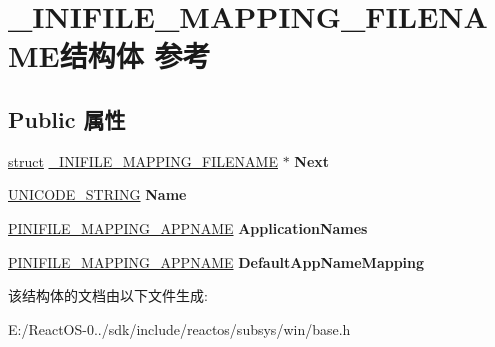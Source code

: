 \hypertarget{struct___i_n_i_f_i_l_e___m_a_p_p_i_n_g___f_i_l_e_n_a_m_e}{}\section{\+\_\+\+I\+N\+I\+F\+I\+L\+E\+\_\+\+M\+A\+P\+P\+I\+N\+G\+\_\+\+F\+I\+L\+E\+N\+A\+M\+E结构体 参考}
\label{struct___i_n_i_f_i_l_e___m_a_p_p_i_n_g___f_i_l_e_n_a_m_e}
\subsection*{Public 属性}
\begin{DoxyCompactItemize}
\item 
\mbox{\label{struct___i_n_i_f_i_l_e___m_a_p_p_i_n_g___f_i_l_e_n_a_m_e_aa313afd24e17a2bb6e35eb5c409fce0e}} 
\hyperlink{interfacestruct}{struct} \hyperlink{struct___i_n_i_f_i_l_e___m_a_p_p_i_n_g___f_i_l_e_n_a_m_e}{\+\_\+\+I\+N\+I\+F\+I\+L\+E\+\_\+\+M\+A\+P\+P\+I\+N\+G\+\_\+\+F\+I\+L\+E\+N\+A\+ME} $\ast$ {\bfseries Next}
\item 
\mbox{\label{struct___i_n_i_f_i_l_e___m_a_p_p_i_n_g___f_i_l_e_n_a_m_e_aabda1295635b252870640752d7448807}} 
\hyperlink{struct___u_n_i_c_o_d_e___s_t_r_i_n_g}{U\+N\+I\+C\+O\+D\+E\+\_\+\+S\+T\+R\+I\+NG} {\bfseries Name}
\item 
\mbox{\label{struct___i_n_i_f_i_l_e___m_a_p_p_i_n_g___f_i_l_e_n_a_m_e_a5af554ac5f18413ec91afc6218ea0535}} 
\hyperlink{struct___i_n_i_f_i_l_e___m_a_p_p_i_n_g___a_p_p_n_a_m_e}{P\+I\+N\+I\+F\+I\+L\+E\+\_\+\+M\+A\+P\+P\+I\+N\+G\+\_\+\+A\+P\+P\+N\+A\+ME} {\bfseries Application\+Names}
\item 
\mbox{\label{struct___i_n_i_f_i_l_e___m_a_p_p_i_n_g___f_i_l_e_n_a_m_e_a034bfb7fcc9e8a48d986386885ad0c52}} 
\hyperlink{struct___i_n_i_f_i_l_e___m_a_p_p_i_n_g___a_p_p_n_a_m_e}{P\+I\+N\+I\+F\+I\+L\+E\+\_\+\+M\+A\+P\+P\+I\+N\+G\+\_\+\+A\+P\+P\+N\+A\+ME} {\bfseries Default\+App\+Name\+Mapping}
\end{DoxyCompactItemize}


该结构体的文档由以下文件生成\+:\begin{DoxyCompactItemize}
\item 
E\+:/\+React\+O\+S-\/0../sdk/include/reactos/subsys/win/base.\+h\end{DoxyCompactItemize}
